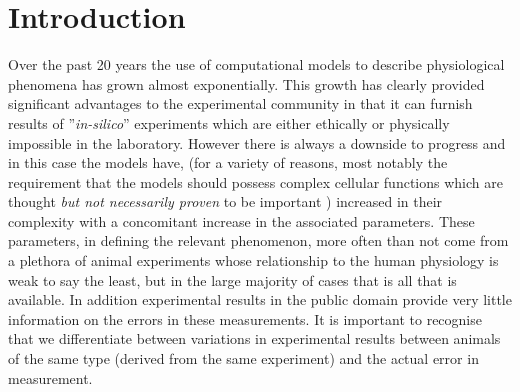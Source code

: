 \section{Introduction}\label{sec:intro}
Over the past 20 years the use of computational models to describe physiological phenomena has grown almost exponentially. This growth has clearly provided significant advantages to the experimental community in that it can furnish results of ''\textit{in-silico}'' experiments which are either ethically or physically impossible in the laboratory. However there is always a downside to progress and in this case the models have, (for a variety of reasons, most notably the requirement that the models should possess complex cellular functions which are thought \textit{but not necessarily proven} to be important ) increased in their complexity with a concomitant increase in the associated parameters. These parameters, in defining the relevant phenomenon, more often than not come from a plethora of animal experiments whose relationship to the human physiology is weak to say the least, but in the large majority of cases that is all that is available.  In addition experimental results in the public domain provide very little information on the errors in these measurements. It is important to recognise that we differentiate between variations in experimental results between animals of the same type (derived from the same experiment) and the actual error in measurement. \\

